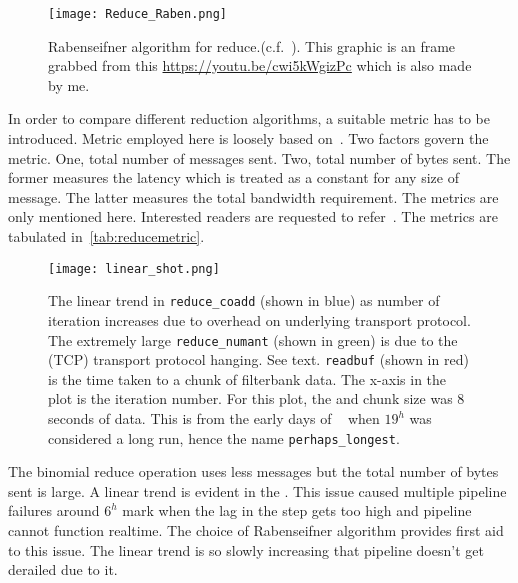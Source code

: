 \begin{figure}
	\centering
	\label{fig:rabenreduce}
	\texttt{[image: Reduce\_Raben.png]}
	\caption{Rabenseifner algorithm for \mpi reduce.(c.f.~\cite{raben}).
		This graphic is an frame grabbed from this \url{https://youtu.be/cwi5kWgizPc} which is also made by me.
	}
\end{figure}


\par In order to compare different reduction algorithms, a suitable metric has to be introduced.
Metric employed here is loosely based on~\cite{raben}. 
Two factors govern the metric. One, total number of messages sent. Two, total number of bytes sent.
The former measures the latency which is treated as a constant for any size of message. The latter measures the total bandwidth requirement.
The metrics are only mentioned here. Interested readers are requested to refer~\cite{raben}.
The metrics are tabulated in~\autoref{tab:reducemetric}.

\begin{figure}
	\label{fig:linearshot}
	\centering
	\texttt{[image: linear\_shot.png]}
	\caption{The linear trend in \texttt{reduce\_coadd} (shown in blue) as number of iteration increases due to overhead on underlying transport protocol.
		The extremely large \texttt{reduce\_numant} (shown in green) is due to the (TCP) transport protocol hanging. See text.
		\texttt{readbuf} (shown in red) is the time taken to a chunk of filterbank data. 
		The x-axis in the plot is the iteration number. For this plot, the  and chunk size was $8$ seconds of data. 
		This is from the early days of \vf~ when $19^h$ was considered a long run, hence the name \texttt{perhaps\_longest}.
	 }
\end{figure}

\par The binomial reduce operation uses less messages but the total number of bytes sent is large. 
A linear trend is evident in the . This issue caused multiple pipeline failures around $6^h$ mark when the lag in the step gets too high and pipeline cannot function realtime.
The choice of Rabenseifner algorithm provides first aid to this issue. The linear trend is so slowly increasing that pipeline doesn't get derailed due to it.

